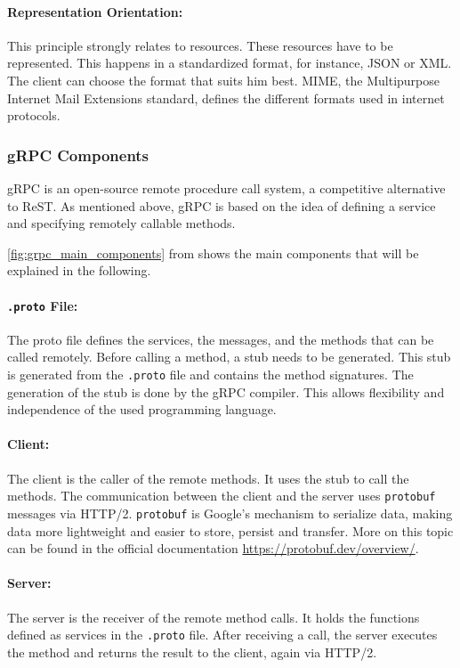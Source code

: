 \paragraph*{Representation Orientation:}
This principle strongly relates to resources.
These resources have to be represented.
This happens in a standardized format, for instance, JSON or XML.
The client can choose the format that suits him best.
MIME, the Multipurpose Internet Mail Extensions standard, defines the different formats used in internet protocols.

\subsubsection*{gRPC Components}
gRPC is an open-source remote procedure call system, a competitive alternative to ReST.
As mentioned above, gRPC is based on the idea of defining a service and specifying remotely callable methods.

\autoref{fig:grpc_main_components} from \cite{CM-T-DES} shows the main components that will be explained in the following.

\paragraph*{\texttt{.proto} File:}
The proto file defines the services, the messages, and the methods that can be called remotely.
Before calling a method, a stub needs to be generated.
This stub is generated from the \texttt{.proto} file and contains the method signatures.
The generation of the stub is done by the gRPC compiler.
This allows flexibility and independence of the used programming language.

\paragraph*{Client:}
The client is the caller of the remote methods.
It uses the stub to call the methods.
The communication between the client and the server uses \texttt{protobuf} messages via HTTP/2.
\texttt{protobuf} is Google's mechanism to serialize data, making data more lightweight and easier to store, persist and transfer.
More on this topic can be found in the official documentation \url{https://protobuf.dev/overview/}.

\paragraph*{Server:}
The server is the receiver of the remote method calls.
It holds the functions defined as services in the \texttt{.proto} file.
After receiving a call, the server executes the method and returns the result to the client, again via HTTP/2.

